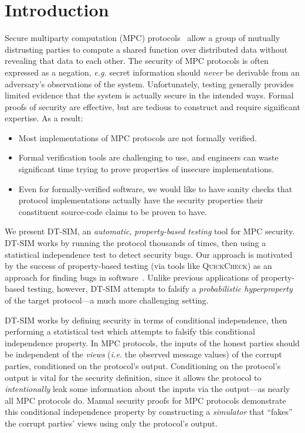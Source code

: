 \documentclass[acmlarge, manuscript, screen, review, anonymous, table]{acmart}
\newcommand{\eg}{\textit{e.g.}\xspace}
\newcommand{\ie}{\textit{i.e.}\xspace}
\newcommand{\toolname}{\textsc{DT-SIM}\xspace}
\begin{document}
\section{Introduction}

Secure multiparty computation (MPC) protocols~\cite{evans2018pragmatic} allow a group of mutually distrusting parties to compute a shared function over distributed data without revealing that data to each other.
The security of MPC protocols is often expressed as a negation,
\eg secret information should \emph{never} be derivable from an adversary's observations of the system.
Unfortunately, testing generally provides limited evidence that the system is actually secure in the intended ways.
Formal proofs of security are effective, but are tedious to construct and require significant expertise.
As a result:
%
\begin{itemize}
\item Most implementations of MPC protocols are not formally verified.
\item Formal verification tools are challenging to use, and engineers can waste significant time trying to prove properties of insecure implementations.
\item Even for formally-verified software, we would like to have sanity checks
  that protocol implementations actually have the security properties their constituent source-code claims to be proven to have.
\end{itemize}

We present \toolname, an \emph{automatic}, \emph{property-based testing} tool for MPC security. \toolname works by running the protocol thousands of times, then using a statistical independence test to detect security bugs. Our approach is motivated by the success of property-based testing (via tools like \textsc{QuickCheck}) as an approach for finding bugs in software~\cite{fink1997property, claessen2000quickcheck, paraskevopoulou2015foundational}. Unlike previous applications of property-based testing, however, \toolname attempts to falsify a \emph{probabilistic hyperproperty} of the target protocol---a much more challenging setting.

\toolname works by defining security in terms of conditional independence, then performing a statistical test which attempts to falsify this conditional independence property. In MPC protocols, the inputs of the honest parties should be independent of the \emph{views} (\ie the observed message values) of the corrupt parties, conditioned on the protocol's output. Conditioning on the protocol's output is vital for the security definition, since it allows the protocol to \emph{intentionally} leak some information about the inputs via the output---as nearly all MPC protocols do. Manual security proofs for MPC protocols demonstrate this conditional independence property by constructing a \emph{simulator} that ``fakes'' the corrupt parties' views using only the protocol's output.
\end{document}
